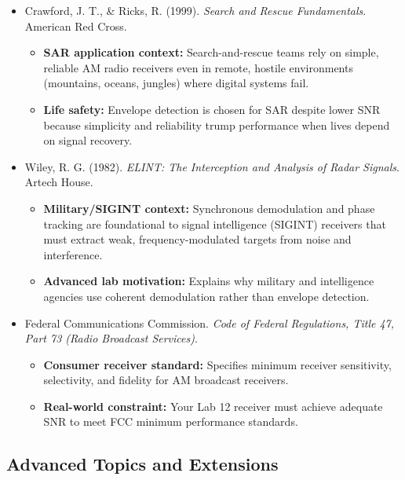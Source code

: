 \documentclass[11pt,letterpaper]{article}
\begin{document}
\begin{itemize}
    \item Crawford, J. T., \& Ricks, R. (1999). \textit{Search and Rescue Fundamentals}. American Red Cross.
    \begin{itemize}
        \item \textbf{SAR application context:} Search-and-rescue teams rely on simple, reliable AM radio receivers even in remote, hostile environments (mountains, oceans, jungles) where digital systems fail.
        \item \textbf{Life safety:} Envelope detection is chosen for SAR despite lower SNR because simplicity and reliability trump performance when lives depend on signal recovery.
    \end{itemize}

    \item Wiley, R. G. (1982). \textit{ELINT: The Interception and Analysis of Radar Signals}. Artech House.
    \begin{itemize}
        \item \textbf{Military/SIGINT context:} Synchronous demodulation and phase tracking are foundational to signal intelligence (SIGINT) receivers that must extract weak, frequency-modulated targets from noise and interference.
        \item \textbf{Advanced lab motivation:} Explains why military and intelligence agencies use coherent demodulation rather than envelope detection.
    \end{itemize}

    \item Federal Communications Commission. \textit{Code of Federal Regulations, Title 47, Part 73 (Radio Broadcast Services)}.
    \begin{itemize}
        \item \textbf{Consumer receiver standard:} Specifies minimum receiver sensitivity, selectivity, and fidelity for AM broadcast receivers.
        \item \textbf{Real-world constraint:} Your Lab 12 receiver must achieve adequate SNR to meet FCC minimum performance standards.
    \end{itemize}
\end{itemize}

\subsection*{Advanced Topics and Extensions}
\end{document}
